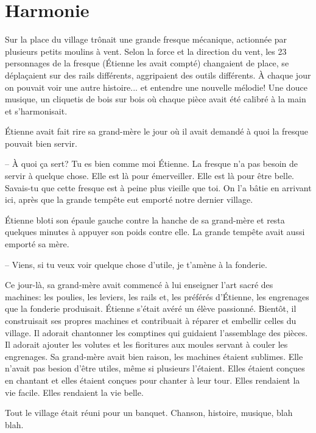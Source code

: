 \chapter{Harmonie}

Sur la place du village trônait une grande fresque mécanique, actionnée par
plusieurs petits moulins à vent.
%
Selon la force et la direction du vent, les 23 personnages de la fresque
(Étienne les avait compté) changaient de place, se déplaçaient sur des rails
différents, aggripaient des outils différents.  
%
À chaque jour on pouvait voir une autre histoire... et entendre une nouvelle
mélodie!  
%
Une douce musique, un cliquetis de bois sur bois où chaque pièce
avait été calibré à la main et s'harmonisait.

Étienne avait fait rire sa grand-mère le jour où il avait demandé à quoi la
fresque pouvait bien servir.

-- À quoi ça sert? Tu es bien comme moi Étienne. La fresque n'a pas besoin de
servir à quelque chose. Elle est là pour émerveiller. Elle est là pour être
belle. Savais-tu que cette fresque est à peine plus vieille que toi. On l'a
bâtie en arrivant ici, après que la grande tempête eut emporté 
notre dernier village.

Étienne bloti son épaule gauche contre la hanche de sa grand-mère
et resta quelques minutes à appuyer son poids contre elle.
%
La grande tempête avait aussi emporté sa mère.

-- Viens, si tu veux voir quelque chose d'utile, je t'amène à la fonderie.

Ce jour-là, sa grand-mère avait commencé à lui enseigner l'art sacré des
machines: les poulies, les leviers, les rails et, les préférés d'Étienne, les
engrenages que la fonderie produisait.
%
Étienne s'était avéré un élève passionné.
%
Bientôt, il construisait ses propres machines et contribuait à réparer et
embellir celles du village.  
%
Il adorait chantonner les comptines qui guidaient
l'assemblage des pièces.  
%
Il adorait ajouter les volutes et les fioritures aux
moules servant à couler les engrenages. 
%
Sa grand-mère avait bien raison,
les machines étaient sublimes.  
%
Elle n'avait pas besion d'être utiles, même si
plusieurs l'étaient.  
%
Elles étaient conçues en chantant et elles étaient conçues
pour chanter à leur tour.  
%
Elles rendaient la vie facile. 
%
Elles rendaient la
vie belle.

\sautSection{}

Tout le village était réuni pour un banquet. Chanson, histoire, musique, blah blah.

